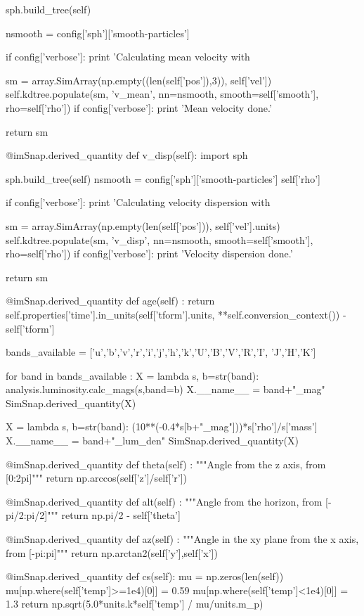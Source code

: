     sph.build_tree(self)

    nsmooth = config['sph']['smooth-particles']

    if config['verbose']: print 'Calculating mean velocity with %

    sm = array.SimArray(np.empty((len(self['pos']),3)), self['vel'])
    self.kdtree.populate(sm, 'v_mean', nn=nsmooth, smooth=self['smooth'],
rho=self['rho'])
    if config['verbose']: print 'Mean velocity done.'

    return sm

@imSnap.derived_quantity
def v_disp(self):
    import sph

    sph.build_tree(self)
    nsmooth = config['sph']['smooth-particles']
    self['rho']

    if config['verbose']: print 'Calculating velocity dispersion with %

    sm = array.SimArray(np.empty(len(self['pos'])), self['vel'].units)
    self.kdtree.populate(sm, 'v_disp', nn=nsmooth, smooth=self['smooth'],
rho=self['rho'])
    if config['verbose']: print 'Velocity dispersion done.'

    return sm

@imSnap.derived_quantity
def age(self) :
    return self.properties['time'].in_units(self['tform'].units,
**self.conversion_context()) - self['tform']

bands_available = ['u','b','v','r','i','j','h','k','U','B','V','R','I',
                   'J','H','K']

for band in bands_available :
    X = lambda s, b=str(band): analysis.luminosity.calc_mags(s,band=b)
    X.__name__ = band+"_mag"
    SimSnap.derived_quantity(X)

    X = lambda s, b=str(band): (10**(-0.4*s[b+"_mag"]))*s['rho']/s['mass']
    X.__name__ = band+"_lum_den"
    SimSnap.derived_quantity(X)

@imSnap.derived_quantity
def theta(self) :
	"""Angle from the z axis, from [0:2pi]"""
	return np.arccos(self['z']/self['r'])

@imSnap.derived_quantity
def alt(self) :
	"""Angle from the horizon, from [-pi/2:pi/2]"""
	return np.pi/2 - self['theta']

@imSnap.derived_quantity
def az(self) :
	"""Angle in the xy plane from the x axis, from [-pi:pi]"""
	return np.arctan2(self['y'],self['x'])

@imSnap.derived_quantity
def cs(self):
    mu = np.zeros(len(self))
    mu[np.where(self['temp']>=1e4)[0]] = 0.59
    mu[np.where(self['temp']<1e4)[0]] = 1.3
    return np.sqrt(5.0*units.k*self['temp'] / mu/units.m_p)



